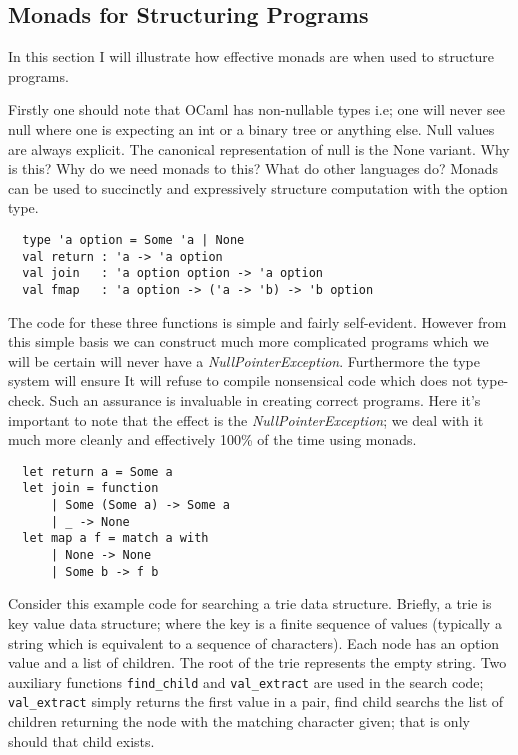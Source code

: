 \subsection{Monads for Structuring Programs}
In this section I will illustrate how effective monads are when used to structure programs.

Firstly one should note that OCaml has non-nullable types
i.e; one will never see null where one is expecting an
int or a binary tree or anything else.
Null values are always explicit.
The canonical representation of null is the None variant.
Why is this?
Why do we need monads to this?
What do other languages do?
Monads can be used to succinctly and expressively structure computation with the option type.

\begin{verbatim}
  type 'a option = Some 'a | None
  val return : 'a -> 'a option
  val join   : 'a option option -> 'a option
  val fmap   : 'a option -> ('a -> 'b) -> 'b option
\end{verbatim}

The code for these three functions is simple and fairly self-evident.
However from this simple basis we can construct much more complicated programs which we
will be certain will never have a \textit{NullPointerException}.
Furthermore the type system will ensure 
It will refuse to compile nonsensical code which does not type-check.
Such an assurance is invaluable in creating correct programs.
Here it's important to note that the effect is the \textit{NullPointerException};
we deal with it much more cleanly and effectively 100\% of the time using monads.

\begin{verbatim}
  let return a = Some a
  let join = function
      | Some (Some a) -> Some a
      | _ -> None
  let map a f = match a with
      | None -> None
      | Some b -> f b
\end{verbatim}

Consider this example code for searching a trie data structure.
Briefly, a trie is key value data structure;
where the key is a finite sequence of values
(typically a string which is equivalent to a sequence of characters).
Each node has an option value and a list of children.
The root of the trie represents the empty string.
Two auxiliary functions \texttt{find\_child} and \texttt{val\_extract}
are used in the search code; \texttt{val\_extract}
simply returns the first value in a pair,
find child searchs the list of children returning
the node with the matching character given;
that is only should that child exists.

